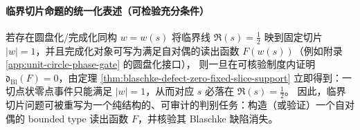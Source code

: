 \paragraph{临界切片命题的统一化表述（可检验充分条件）}
若存在圆盘化/完成化同构 \(w=w(s)\) 将临界线 \(\Re(s)=\tfrac12\) 映到固定切片 \(|w|=1\)，并且完成化对象可写为满足自对偶的读出函数 \(F(w(s))\)（例如附录 \ref{app:unit-circle-phase-gate} 的圆盘化接口），
则一旦在可核验制度内证明 \(\mathfrak{d}_{\mathrm{Bl}}(F)=0\)，由定理 \ref{thm:blaschke-defect-zero-fixed-slice-support} 立即得到：一切点状零点事件只能满足 \(|w|=1\)，从而对应 \(s\) 必落在 \(\Re(s)=\tfrac12\)。
因此，临界切片问题可被重写为一个纯结构的、可审计的判别任务：构造（或验证）一个自对偶的 bounded type 读出函数 \(F\)，并核验其 Blaschke 缺陷消失。
